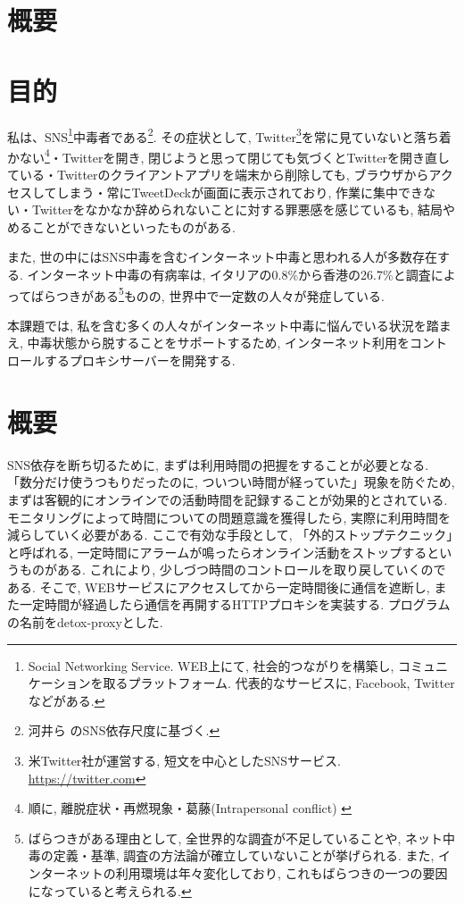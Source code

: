 \documentclass[a4paper,uplatex,a4j,dvipdfmx]{jsarticle}
\begin{document}
    \section*{概要}


    \newpage

    \begin{multicols}{2}

    \section{目的}
    私は、SNS\footnote{Social Networking Service. WEB上にて, 社会的つながりを構築し, コミュニケーションを取るプラットフォーム. 代表的なサービスに, Facebook, Twitterなどがある.}中毒者である\footnote{河井ら \cite{kawai2011sns} のSNS依存尺度に基づく.}.
    その症状として, Twitter\footnote{米Twitter社が運営する, 短文を中心としたSNSサービス. \url{https://twitter.com}}を常に見ていないと落ち着かない\footnote{順に, 離脱症状・再燃現象・葛藤(Intrapersonal conflict) \cite{griffiths2005} \label{tw}}・Twitterを開き, 閉じようと思って閉じても気づくとTwitterを開き直している・Twitterのクライアントアプリを端末から削除しても, ブラウザからアクセスしてしまう・常にTweetDeckが画面に表示されており, 作業に集中できない・Twitterをなかなか辞められないことに対する罪悪感を感じているも, 結局やめることができないといったものがある.
    
    また, 世の中にはSNS中毒を含むインターネット中毒と思われる人が多数存在する.
    インターネット中毒の有病率は, イタリアの0.8\%から香港の26.7\%と調査によってばらつきがある\footnote{ばらつきがある理由として, 全世界的な調査が不足していることや, ネット中毒の定義・基準, 調査の方法論が確立していないことが挙げられる\cite{IAreview}. また, インターネットの利用環境は年々変化しており, これもばらつきの一つの要因になっていると考えられる.}ものの, 世界中で一定数の人々が発症している.
    
  本課題では, 私を含む多くの人々がインターネット中毒に悩んでいる状況を踏まえ, 中毒状態から脱することをサポートするため, インターネット利用をコントロールするプロキシサーバーを開発する.



    \section{概要}
    SNS依存を断ち切るために, まずは利用時間の把握をすることが必要となる. 「数分だけ使うつもりだったのに, ついつい時間が経っていた」現象を防ぐため, まずは客観的にオンラインでの活動時間を記録することが効果的とされている\cite{internetaddiction}.
    モニタリングによって時間についての問題意識を獲得したら, 実際に利用時間を減らしていく必要がある. ここで有効な手段として, 「外的ストップテクニック」と呼ばれる, 一定時間にアラームが鳴ったらオンライン活動をストップするというものがある\cite{internetaddiction}. これにより, 少しづつ時間のコントロールを取り戻していくのである.
    そこで, WEBサービスにアクセスしてから一定時間後に通信を遮断し, また一定時間が経過したら通信を再開するHTTPプロキシを実装する.
    プログラムの名前をdetox-proxyとした.
    

\end{multicols}
\end{document}

